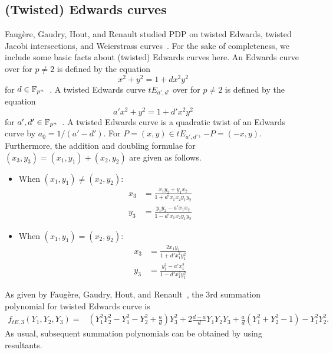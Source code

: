 %
%

\subsection{(Twisted) Edwards curves}
\label{sec:twisted-edwards}


Faug\`ere, Gaudry, Hout, and Renault studied PDP on twisted Edwards,
twisted Jacobi intersections, and Weierstrass
curves~\cite{DBLP:journals/joc/FaugereGHR14}.
%
For the sake of completeness, we include some basic facts about
(twisted) Edwards curves here.
%
%
An Edwards curve over  for $p\neq 2$ is defined by the
equation \begin{equation*}
  x^2+y^2=1+dx^2y^2 \label{eq:edwards-curve} \end{equation*} for
$d\in\mathbb F_{p^n}$~\cite{DBLP:journals/iacr/BernsteinL07}.
%
A twisted Edwards curve $tE_{a',d'}$ over  for $p\neq 2$ is
defined by the equation \begin{equation}
  a'x^2+y^2=1+d'x^2y^2 \label{eq:twisted-edwards-curve} \end{equation}
for $a',d'\in\mathbb F_{p^n}$~\cite{DBLP:journals/iacr/BernsteinBJLP08}.
%
A twisted Edwards curve is a quadratic twist of an Edwards curve by
$a_0=1/(a'-d')$.
%
For $P=(x,y)\in tE_{a',d'}$, $-P=(-x,y)$.
%
Furthermore, the addition and doubling formulae for
$(x_3,y_3)=(x_1,y_1)+(x_2,y_2)$ are given as follows.
%
\begin{itemize}
\item When $(x_1,y_1)\neq(x_2,y_2)$:
  \begin{align*}
    x_3 & = \frac{x_1y_2 + y_1x_2}{1 + d'x_1x_2y_1y_2} \\
    y_3 & = \frac{y_1y_2 - a'x_1x_2}{1 - d'x_1x_2y_1y_2}
  \end{align*}
\item When $(x_1,y_1)=(x_2,y_2)$:
  \begin{align*}
    x_3 & = \frac{2x_1y_1}{1 + d'x_1^2y_1^2} \\
    y_3 & = \frac{y_1^2 - a'x_1^2}{1 - d'x_1^2y_1^2}
  \end{align*}
\end{itemize}
%
As given by Faug\`ere, Gaudry, Hout, and
Renault~\cite{DBLP:journals/joc/FaugereGHR14}, the 3rd summation
polynomial for twisted Edwards curve is
%
\begin{align*}
  f_{tE, 3}(Y_1,Y_2,Y_3) = & \left(Y_1^2Y_2^2 - Y_1^2 - Y_2^2 + \frac{a}{d}\right)Y_3^2  + 2\frac{d-a}{d}Y_1Y_2Y_3 +
                             \frac{a}{d}\left(Y_1^2 + Y_2^2 - 1\right)
                             - Y_1^2Y_2^2.
\end{align*}
%
As usual, subsequent summation polynomials can be obtained by using
resultants.



